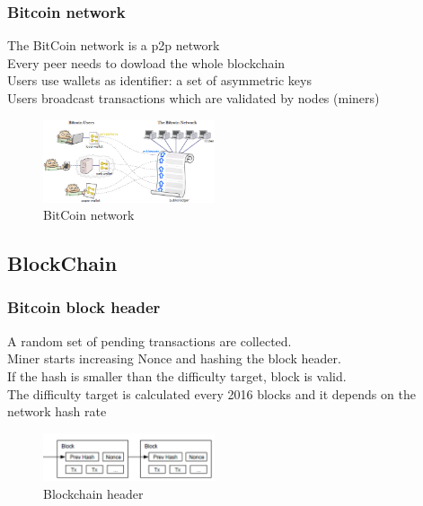 \documentclass[usepdftitle=false,13pt]{beamer}
\begin{document}
\begin{frame}\frametitle{Bitcoin network}
The BitCoin network is a p2p network\\
Every peer needs to dowload the whole blockchain\\
Users use wallets as identifier: a set of asymmetric keys\\
Users broadcast transactions which are validated by nodes (miners)\\
\begin{figure}[h!]
\begin{center}
\includegraphics[width=0.45\textwidth]{pic/bitcoin-network}
\caption{BitCoin network}
\label{fig:block}
\end{center}
\end{figure}
\end{frame}

\subsection{BlockChain}

\begin{frame}\frametitle{Bitcoin block header}
A random set of pending transactions are collected.\\
Miner starts increasing Nonce and hashing the block header.\\
If the hash is smaller than the difficulty target, block is valid.\\
The difficulty target is calculated every 2016 blocks and it depends on the network hash rate\\
\begin{figure}[h!]
\begin{center}
\includegraphics[width=0.45\textwidth]{pic/block}
\caption{Blockchain header}
\label{fig:block}
\end{center}
\end{figure}
\end{frame}
\end{document}
